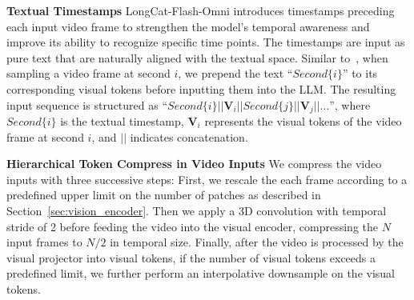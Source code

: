 \documentclass{article}
\begin{document}
\textbf{Textual Timestamps}
LongCat-Flash-Omni introduces timestamps preceding each input video frame to strengthen the model’s temporal awareness and improve its ability to recognize specific time points.
The timestamps are input as pure text that are naturally aligned with the textual space. Similar to~\citep{chen2024timemarker}, when sampling a video frame at second $i$, we prepend the text ``$Second\{i\}$'' to its corresponding visual tokens before inputting them into the LLM. The resulting input sequence is structured as ``$Second\{i\} || \mathbf{V}_i || Second\{j\} || \mathbf{V}_j || \dots$'', where $Second\{i\}$ is the textual timestamp, $\mathbf{V}_i$ represents the visual tokens of the video frame at second $i$, and $||$ indicates concatenation.

\textbf{Hierarchical Token Compress in Video Inputs} We compress the video inputs with three successive steps:
First, we rescale the each frame according to a predefined upper limit on the number of patches as described in Section~\ref{sec:vision_encoder}.
Then we apply a 3D convolution with temporal stride of 2 before feeding the video into the visual encoder, compressing the $N$ input frames to $N/2$ in temporal size.
Finally, after the video is processed by the visual projector into visual tokens, if the number of visual tokens exceeds a predefined limit, we further perform an interpolative downsample on the visual tokens.


\end{document}
